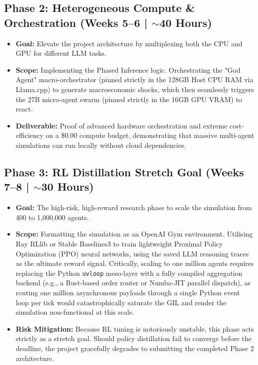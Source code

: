 \documentclass[10pt,a4paper]{article}
\begin{document}
\subsection*{Phase 2: Heterogeneous Compute \& Orchestration (Weeks 5--6 | $\sim$40 Hours)}
\begin{itemize}
    \item \textbf{Goal:} Elevate the project architecture by multiplexing both the CPU and GPU for different LLM tasks.
    \item \textbf{Scope:} Implementing the Phased Inference logic. Orchestrating the "God Agent" macro-orchestrator (pinned strictly in the 128GB Host CPU RAM via Llama.cpp) to generate macroeconomic shocks, which then seamlessly triggers the 27B micro-agent swarm (pinned strictly in the 16GB GPU VRAM) to react.
    \item \textbf{Deliverable:} Proof of advanced hardware orchestration and extreme cost-efficiency on a \$0.00 compute budget, demonstrating that massive multi-agent simulations can run locally without cloud dependencies.
\end{itemize}

\subsection*{Phase 3: RL Distillation Stretch Goal (Weeks 7--8 | $\sim$30 Hours)}
\begin{itemize}
    \item \textbf{Goal:} The high-risk, high-reward research phase to scale the simulation from 400 to 1,000,000 agents.
    \item \textbf{Scope:} Formatting the simulation as an OpenAI Gym environment. Utilising Ray RLlib or Stable Baselines3 to train lightweight Proximal Policy Optimization (PPO) neural networks, using the saved LLM reasoning traces as the ultimate reward signal. Critically, scaling to one million agents requires replacing the Python \texttt{uvloop} meso-layer with a fully compiled aggregation backend (e.g., a Rust-based order router or Numba-JIT parallel dispatch), as routing one million asynchronous payloads through a single Python event loop per tick would catastrophically saturate the GIL and render the simulation non-functional at this scale.
    \item \textbf{Risk Mitigation:} Because RL tuning is notoriously unstable, this phase acts strictly as a stretch goal. Should policy distillation fail to converge before the deadline, the project gracefully degrades to submitting the completed Phase 2 architecture.
\end{itemize}
\end{document}
